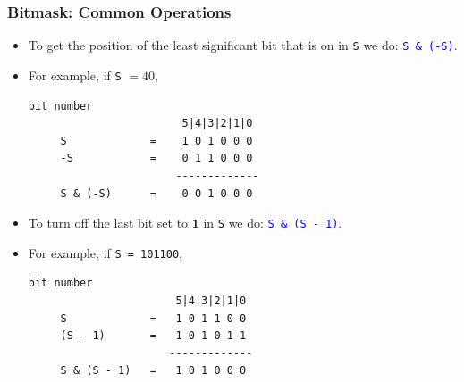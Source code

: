 \documentclass{beamer}
\newcounter{exo}
\newcommand{\exo}{
  \addtocounter{exo}{1}
  Exercice \arabic{exo}
}
\begin{document}
\begin{frame}[fragile]
\frametitle{Bitmask: Common Operations}
\label{slide:bitmask_last_bit}

\scriptsize

\begin{itemize}

\item To get the position of the least significant bit that is on in \verb+S+ we do: \textcolor{blue}{\texttt{S \& (-S)}}.

\vspace{0.1cm}

\item<2-> For example, if \verb+S+ $= 40$,

\begin{center}
\begin{Verbatim}[commandchars=@\[\]]
                         bit number
                        5|4|3|2|1|0
     S             =    1 0 1 0 0 0
     -S            =    0 1 1 0 0 0
                       -------------
     S & (-S)      =    0 0 1 0 0 0
\end{Verbatim}
\end{center}

\vspace{0.1cm}

\item<3-> To turn off the last bit set to $\mathbf{1}$ in \verb+S+ we do: \textcolor{blue}{\texttt{S \& (S - 1)}}.

\vspace{0.1cm}

\item<4-> For example, if \verb+S = 101100+,

\begin{center}
\begin{Verbatim}[commandchars=@\[\]]
                        bit number
                       5|4|3|2|1|0
     S             =   1 0 1 1 0 0
     (S - 1)       =   1 0 1 0 1 1
                      -------------
     S & (S - 1)   =   1 0 1 0 0 0
\end{Verbatim}
\end{center}

\end{itemize}

\end{frame}

\end{document}
